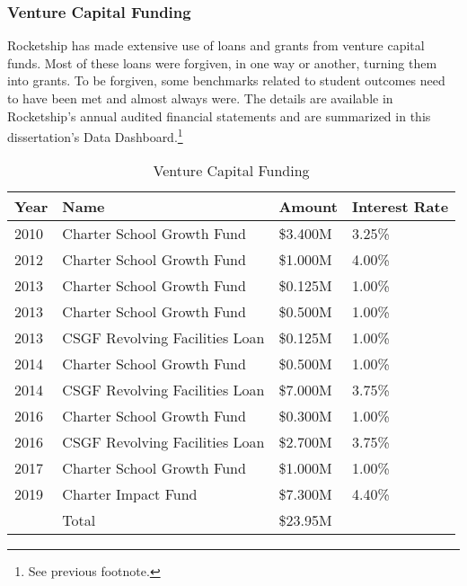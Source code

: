 \subsubsection{Venture Capital Funding}%
\label{sec:venture-capital_funding}\indent%

Rocketship has made extensive use of loans and grants from venture capital funds. Most of these loans were forgiven, in one way or another, turning them into grants. To be forgiven, some benchmarks related to student outcomes need to have been met and almost always were. The details are available in Rocketship's annual audited financial statements and are summarized in this dissertation's Data Dashboard.\footnote{See previous footnote.}

\begin{table}[ht]
  \SingleSpacing
  \caption{Venture Capital Funding}%
  \label{tab:venture_captial_funding}
  \begin{tabular}{llll}
    \toprule
    Year & Name                           & Amount   & Interest Rate \\
    \midrule
    2010 & Charter School Growth Fund     & \$3.400M & 3.25\%        \\
    2012 & Charter School Growth Fund     & \$1.000M & 4.00\%        \\
    2013 & Charter School Growth Fund     & \$0.125M & 1.00\%        \\
    2013 & Charter School Growth Fund     & \$0.500M & 1.00\%        \\
    2013 & CSGF Revolving Facilities Loan & \$0.125M & 1.00\%        \\
    2014 & Charter School Growth Fund     & \$0.500M & 1.00\%        \\
    2014 & CSGF Revolving Facilities Loan & \$7.000M & 3.75\%        \\
    2016 & Charter School Growth Fund     & \$0.300M & 1.00\%        \\
    2016 & CSGF Revolving Facilities Loan & \$2.700M & 3.75\%        \\
    2017 & Charter School Growth Fund     & \$1.000M & 1.00\%        \\
    2019 & Charter Impact Fund            & \$7.300M & 4.40\%        \\
    \midrule
         & Total                          & \$23.95M &               \\
    \bottomrule
  \end{tabular}
\end{table}

